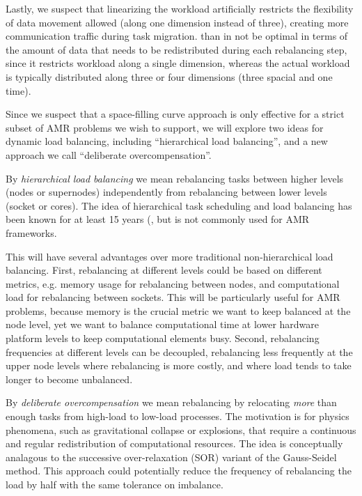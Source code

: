 \documentclass[14pt,letter]{article}
\begin{document}
Lastly, we suspect that linearizing the workload artificially
restricts the flexibility of data movement allowed (along one
dimension instead of three), creating more communication traffic
during task migration.  than in not be optimal in terms of the amount
of data that needs to be redistributed during each rebalancing step,
since it restricts workload along a single dimension, whereas the
actual workload is typically distributed along three or four
dimensions (three spacial and one time).

Since we suspect that a space-filling curve approach is only effective
for a strict subset of AMR problems we wish to support, we will
explore two ideas for dynamic load balancing, including ``hierarchical
load balancing'', and a new approach we call ``deliberate
overcompensation''.

%
By \textit{hierarchical load balancing} we mean rebalancing tasks
between higher levels (nodes or supernodes) independently from
rebalancing between lower levels (socket or cores).  The idea of
hierarchical task scheduling and load balancing has been known for at
least 15 years (\cite{AhGh94}, but is not commonly used for AMR
frameworks.

This will have several advantages over more traditional
non-hierarchical load balancing.  First, rebalancing at different
levels could be based on different metrics, e.g. memory usage for
rebalancing between nodes, and computational load for rebalancing
between sockets.  This will be particularly useful for AMR problems,
because memory is the crucial metric we want to keep balanced at the
node level, yet we want to balance computational time at lower
hardware platform levels to keep computational elements busy.  Second,
rebalancing frequencies at different levels can be decoupled,
rebalancing less frequently at the upper node levels where rebalancing
is more costly, and where load tends to take longer to become
unbalanced.

%
By \textit{deliberate overcompensation} we mean rebalancing by
relocating \textit{more} than enough tasks from high-load to low-load
processes.  The motivation is for physics phenomena, such as
gravitational collapse or explosions, that require a continuous and
regular redistribution of computational resources.  The idea is
conceptually analagous to the successive over-relaxation (SOR) variant
of the Gauss-Seidel method.  This approach could potentially reduce
the frequency of rebalancing the load by half with the same tolerance
on imbalance.
\end{document}

